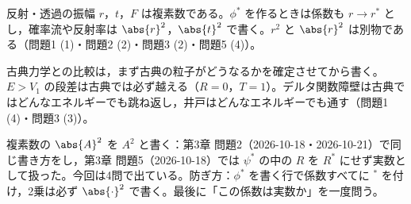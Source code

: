\documentclass[uplatex,dvipdfmx,a4paper,11pt]{jsarticle}
\begin{document}
\matome
\begin{saitenichiran}
\end{saitenichiran}
\begin{daiji}
  \item 反射・透過の振幅 $r$，$t$，$F$ は複素数である。$\phi^{*}$ を作るときは係数も $r\to r^{*}$ とし，確率流や反射率は $\abs{r}^{2}$，$\abs{t}^{2}$ で書く。$r^{2}$ と $\abs{r}^{2}$ は別物である（問題1 (1)・問題2 (2)・問題3 (2)・問題5 (4)）。
  \item 古典力学との比較は，まず古典の粒子がどうなるかを確定させてから書く。$E>V_{1}$ の段差は古典では必ず越える（$R=0$，$T=1$）。デルタ関数障壁は古典ではどんなエネルギーでも跳ね返し，井戸はどんなエネルギーでも通す（問題1 (4)・問題3 (3)）。
\end{daiji}
\begin{maemo}
  \item 複素数の $\abs{A}^{2}$ を $A^{2}$ と書く：第3章 問題2（2026-10-18・2026-10-21）で同じ書き方をし，第3章 問題5（2026-10-18）では $\psi^{*}$ の中の $R$ を $R^{*}$ にせず実数として扱った。今回は4問で出ている。防ぎ方：$\phi^{*}$ を書く行で係数すべてに ${}^{*}$ を付け，2乗は必ず $\abs{\cdot}^{2}$ で書く。最後に「この係数は実数か」を一度問う。
\end{maemo}
\end{document}
